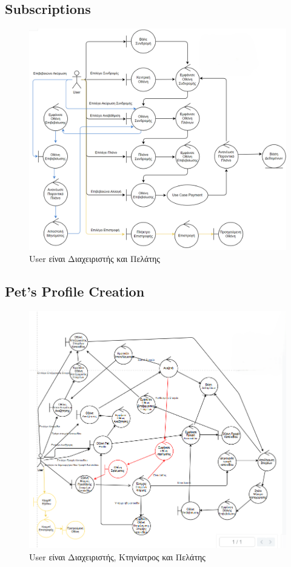 \documentclass[12pt,a4paper,twoside]{book}
\begin{document}
\subsection{Subscriptions}
\begin{figure}[H]
    \centering
    \includegraphics[width=\textwidth]{Resources/Robustness Diagram/Subscription.png}
    \caption{User είναι Διαχειριστής και Πελάτης}\label{fig:robustness-subscription}
\end{figure}

\subsection{Pet's Profile Creation}
\begin{figure}[H]
    \centering
    \includegraphics[width=\textwidth]{Resources/Robustness Diagram/PetProfile.png}
    \caption{User είναι Διαχειριστής, Κτηνίατρος και Πελάτης}\label{fig:robustness-pet-profile}
\end{figure}
\end{document}
